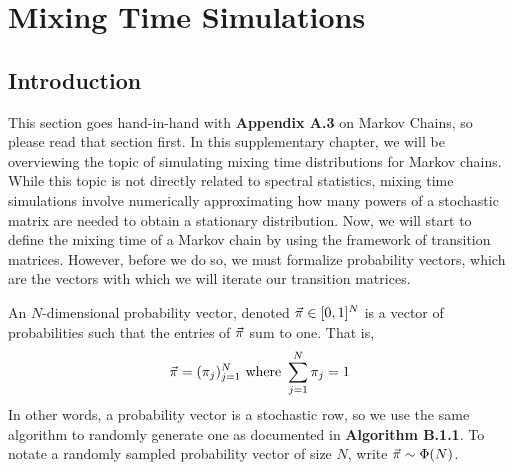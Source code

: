 \chapter{Mixing Time Simulations}
\section{Introduction}

This section goes hand-in-hand with \textbf{Appendix A.3} on Markov Chains, so please read that section first.
In this supplementary chapter, we will be overviewing the topic of simulating mixing time distributions for Markov chains.
While this topic is not directly related to spectral statistics,
mixing time simulations involve numerically approximating how many powers of a stochastic matrix are needed to obtain a stationary distribution.
%
Now, we will start to define the mixing time of a Markov chain by using the framework of transition matrices.
However, before we do so, we must formalize probability vectors, which are the vectors with which we will iterate our transition matrices.


\begin{definition}
An $N$-dimensional probability vector, denoted $\vec{\pi} \in [0,1]^N$ is a vector of probabilities such that the entries of $\vec{\pi}$ sum to one. That is,
$$\vec{\pi} = (\pi_j)_{j = 1}^N \text{ where } \sum_{j = 1}^N \pi_j = 1$$
In other words, a probability vector is a stochastic row, so we use the same algorithm to randomly generate one as documented in \textbf{Algorithm B.1.1}.
To notate a randomly sampled probability vector of size $N$, write $\vec{\pi} \sim \Phi(N)$.

\end{definition}


